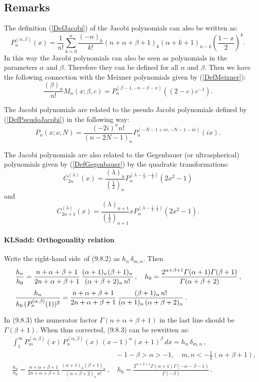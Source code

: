 \documentclass[envcountchap,graybox]{svmono}
\renewcommand{\Gamma}{\varGamma}
\newcommand\sa{\smallskipamount}
\newcommand\sLP{\\[\sa]}
\newcommand\al\alpha
\newcommand\be\beta
\newcommand\de\delta
\newcommand\Ga{\Gamma}
\newcommand\thalf{\tfrac12}
\newcommand\iy\infty
\newcommand\RHS{right-hand side}
\begin{document}
\subsection*{Remarks}
The definition (\ref{DefJacobi}) of the Jacobi polynomials can also be written as:
$$P_n^{(\alpha,\beta)}(x)=\frac{1}{n!}\sum_{k=0}^n\frac{(-n)_k}{k!}
(n+\alpha+\beta+1)_k(\alpha+k+1)_{n-k}\left(\frac{1-x}{2}\right)^k.$$
In this way the Jacobi polynomials can also be seen as polynomials in the parameters $\alpha$
and $\beta$. Therefore they can be defined for all $\alpha$ and $\beta$. Then we have the
following connection with the Meixner polynomials given by (\ref{DefMeixner}):
$$\frac{(\beta)_n}{n!}M_n(x;\beta,c)=P_n^{(\beta-1,-n-\beta-x)}((2-c)c^{-1}).$$

\noindent
The Jacobi polynomials are related to the pseudo Jacobi polynomials defined by
(\ref{DefPseudoJacobi}) in the following way:
$$P_n(x;\nu,N)=\frac{(-2i)^nn!}{(n-2N-1)_n}P_n^{(-N-1+i\nu,-N-1-i\nu)}(ix).$$

\noindent
The Jacobi polynomials are also related to the Gegenbauer (or ultraspherical) polynomials
given by (\ref{DefGegenbauer}) by the quadratic transformations:
$$C_{2n}^{(\lambda)}(x)=\frac{(\lambda)_n}{(\frac{1}{2})_n}
P_n^{(\lambda-\frac{1}{2},-\frac{1}{2})}(2x^2-1)$$
and
$$C_{2n+1}^{(\lambda)}(x)=\frac{(\lambda)_{n+1}}{(\frac{1}{2})_{n+1}}
xP_n^{(\lambda-\frac{1}{2},\frac{1}{2})}(2x^2-1).$$
%
\paragraph{\large\bf KLSadd: Orthogonality relation}Write the \RHS\ of (9.8.2) as $h_n\,\de_{m,n}$. Then
\begin{equation}
\begin{split}
&\frac{h_n}{h_0}=
\frac{n+\al+\be+1}{2n+\al+\be+1}\,
\frac{(\al+1)_n(\be+1)_n}{(\al+\be+2)_n\,n!}\,,\quad
h_0=\frac{2^{\al+\be+1}\Ga(\al+1)\Ga(\be+1)}{\Ga(\al+\be+2)}\,,\sLP
&\frac{h_n}{h_0\,(P_n^{(\al,\be)}(1))^2}=
\frac{n+\al+\be+1}{2n+\al+\be+1}\,
\frac{(\be+1)_n\,n!}{(\al+1)_n\,(\al+\be+2)_n}\,.
\end{split}
\label{60}
\end{equation}

In (9.8.3) the numerator factor $\Ga(n+\al+\be+1)$ in the last line should be
$\Ga(\be+1)$. When thus corrected, (9.8.3) can be rewritten as:
\begin{equation}
\begin{split}
&\int_1^\iy P_m^{(\al,\be)}(x)\,P_n^{(\al,\be)}(x)\,(x-1)^\al (x+1)^\be\,dx=h_n\,\de_{m,n}\,,\\
&\qquad\qquad\qquad\qquad\qquad\qquad\qquad\quad-1-\be>\al>-1,\quad m,n<-\thalf(\al+\be+1),\\
&\frac{h_n}{h_0}=
\frac{n+\al+\be+1}{2n+\al+\be+1}\,
\frac{(\al+1)_n(\be+1)_n}{(\al+\be+2)_n\,n!}\,,\quad
h_0=\frac{2^{\al+\be+1}\Ga(\al+1)\Ga(-\al-\be-1)}{\Ga(-\be)}\,.
\end{split}
\label{122}
\end{equation}
\end{document}
